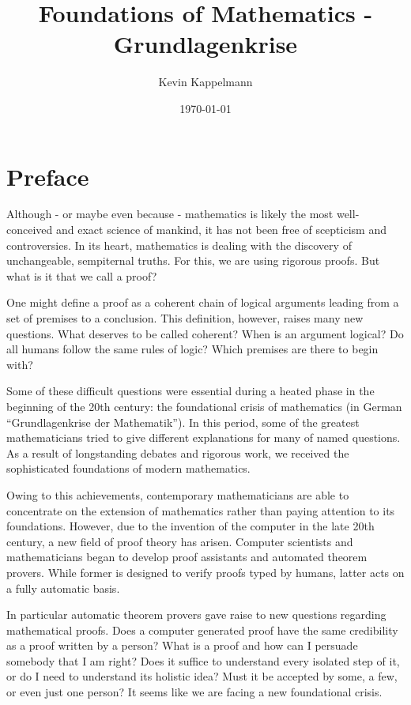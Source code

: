 \documentclass[hidelinks]{article}
\title{\textbf{Foundations of Mathematics - Grundlagenkrise}}
\author{Kevin Kappelmann}
\affil{Chair for Logic and Verification,\\ Technical University of Munich}
\date{\today}
\theoremstyle{plain}
\theoremstyle{definition}
\theoremstyle{rem}
\begin{document}

\maketitle
\newpage
\section*{Preface}
Although - or maybe even because - mathematics is likely the most well-conceived and exact science of mankind, it has not been free of scepticism and controversies. In its heart, mathematics is dealing with the discovery of unchangeable, sempiternal truths. For this, we are using rigorous proofs. But what is it that we call a proof? 

One might define a proof as a coherent chain of logical arguments leading from a set of premises to a conclusion. This definition, however, raises many new questions. What deserves to be called coherent? When is an argument logical? Do all humans follow the same rules of logic? Which premises are there to begin with?

Some of these difficult questions were essential during a heated phase in the beginning of the 20th century: the foundational crisis of mathematics (in German ``Grundlagenkrise der Mathematik''). In this period, some of the greatest mathematicians tried to give different explanations for many of named questions. As a result of longstanding debates and rigorous work, we received the sophisticated foundations of modern mathematics.

Owing to this achievements, contemporary mathematicians are able to concentrate on the extension of mathematics rather than paying attention to its foundations. However, due to the invention of the computer in the late 20th century, a new field of proof theory has arisen. Computer scientists and mathematicians began to develop proof assistants and automated theorem provers. While former is designed to verify proofs typed by humans, latter acts on a fully automatic basis.

In particular automatic theorem provers gave raise to new questions regarding mathematical proofs. Does a computer generated proof have the same credibility as a proof written by a person? What is a proof and how can I persuade somebody that I am right? Does it suffice to understand every isolated step of it, or do I need to understand its holistic idea? Must it be accepted by some, a few, or even just one person? It seems like we are facing a new foundational crisis.
\end{document}
